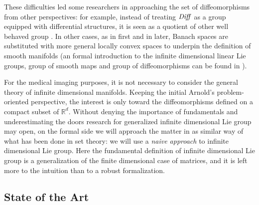 These difficulties led some researchers in approaching the set of diffeomorphisms from other perspectives: 
for example, instead of treating $\text{\emph{Diff}}$ as a group equipped with differential structures, it is seen as a quotient of other well behaved group \cite{wojtynski1994one}. In other cases, as in \cite{marsden1970hamiltonian} first and in \cite{milnor1984remarks} later, Banach spaces are substituted with more general locally convex spaces to underpin the definition of smooth manifolds (an formal introduction to the infinite dimensional linear Lie groups, group of smooth maps and group of diffeomorphisms can be found in \cite{neeb2006infinite}).

For the medical imaging purposes, it is not necessary to consider the general theory of infinite dimensional manifolds. Keeping the initial Arnold's problem-oriented perspective, the interest is only toward the diffeomorphisms defined on a compact subset of $\mathbb{R}^d$. Without denying the importance of fundamentals and underestimating the doors research for generalized infinite dimensional Lie group may open, on the formal side we will approach the matter in as similar way of what has been done in set theory: we will use a \emph{naive approach} to infinite dimensional Lie group. Here the fundamental definition of infinite dimensional Lie group is a generalization of the finite dimensional case of matrices, and it is left more to the intuition than to a robust formalization. 

\subsection{State of the Art}\label{se:state_of_the_art}

